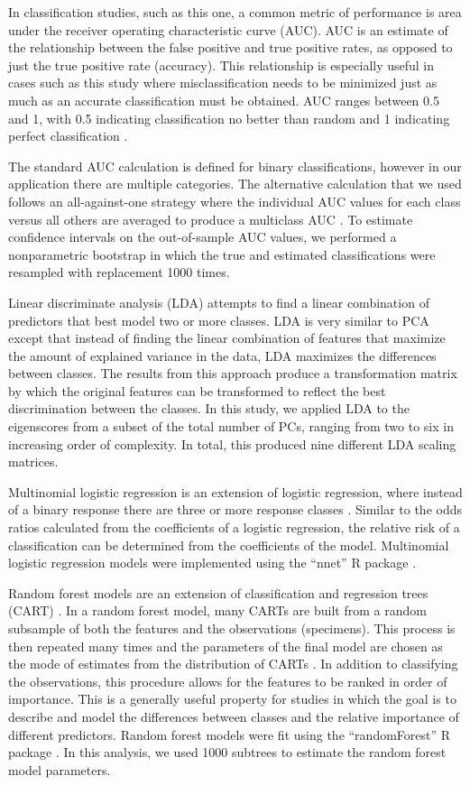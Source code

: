 \documentclass[12pt,letterpaper]{article}
\begin{document}
In classification studies, such as this one, a common metric of performance is area under the receiver operating characteristic curve (AUC). AUC is an estimate of the relationship between the false positive and true positive rates, as opposed to just the true positive rate (accuracy). This relationship is especially useful in cases such as this study where misclassification needs to be minimized just as much as an accurate classification must be obtained. AUC ranges between 0.5 and 1, with 0.5 indicating classification no better than random and 1 indicating perfect classification \citep{Hastie2009}.

The standard AUC calculation is defined for binary classifications, however in our application there are multiple categories. The alternative calculation that we used follows an all-against-one strategy where the individual AUC values for each class versus all others are averaged to produce a multiclass AUC \citep{Hand2001}. To estimate confidence intervals on the out-of-sample AUC values, we performed a nonparametric bootstrap in which the true and estimated classifications were resampled with replacement 1000 times.

Linear discriminate analysis (LDA) attempts to find a linear combination of predictors that best model two or more classes. LDA is very similar to PCA except that instead of finding the linear combination of features that maximize the amount of explained variance in the data, LDA maximizes the differences between classes. The results from this approach produce a transformation matrix by which the original features can be transformed to reflect the best discrimination between the classes. In this study, we applied LDA to the eigenscores from a subset of the total number of PCs, ranging from two to six in increasing order of complexity. In total, this produced nine different LDA scaling matrices. 

Multinomial logistic regression is an extension of logistic regression, where instead of a binary response there are three or more response classes \citep{Venables2002a}. Similar to the odds ratios calculated from the coefficients of a logistic regression, the relative risk of a classification can be determined from the coefficients of the model. Multinomial logistic regression models were implemented using the ``nnet'' R package \citep{Venables2002a}.

Random forest models are an extension of classification and regression trees (CART) \citep{Breiman1984,Breiman2001}. In a random forest model, many CARTs are built from a random subsample of both the features and the observations (specimens). This process is then repeated many times and the parameters of the final model are chosen as the mode of estimates from the distribution of CARTs \citep{Breiman2001}. In addition to classifying the observations, this procedure allows for the features to be ranked in order of importance. This is a generally useful property for studies in which the goal is to describe and model the differences between classes and the relative importance of different predictors. Random forest models were fit using the ``randomForest'' R package \citep{Liaw2002}. In this analysis, we used 1000 subtrees to estimate the random forest model parameters. 
\end{document}
